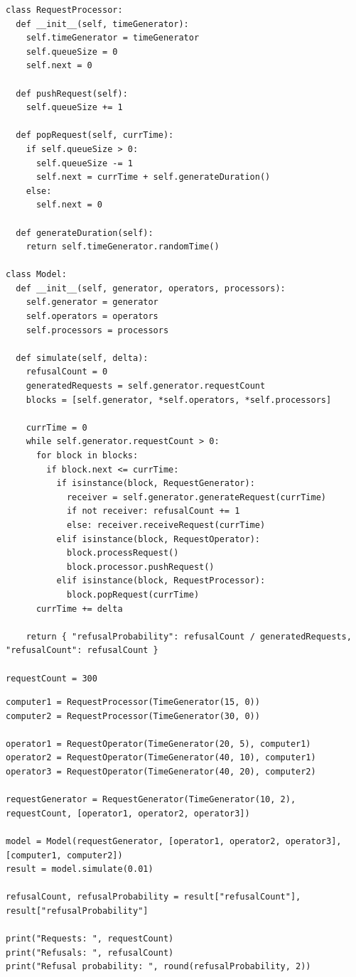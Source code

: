 \documentclass[12pt]{report}
\begin{document}
\begin{lstlisting}
class RequestProcessor:
  def __init__(self, timeGenerator):
    self.timeGenerator = timeGenerator
    self.queueSize = 0
    self.next = 0

  def pushRequest(self):
    self.queueSize += 1

  def popRequest(self, currTime):
    if self.queueSize > 0:
      self.queueSize -= 1
      self.next = currTime + self.generateDuration()
    else:
      self.next = 0

  def generateDuration(self):
    return self.timeGenerator.randomTime()

class Model:
  def __init__(self, generator, operators, processors):
    self.generator = generator
    self.operators = operators
    self.processors = processors

  def simulate(self, delta):
    refusalCount = 0
    generatedRequests = self.generator.requestCount
    blocks = [self.generator, *self.operators, *self.processors]
    
    currTime = 0
    while self.generator.requestCount > 0:
      for block in blocks:
        if block.next <= currTime:
          if isinstance(block, RequestGenerator):
            receiver = self.generator.generateRequest(currTime)
            if not receiver: refusalCount += 1
            else: receiver.receiveRequest(currTime)
          elif isinstance(block, RequestOperator):
            block.processRequest()
            block.processor.pushRequest()
          elif isinstance(block, RequestProcessor):
            block.popRequest(currTime)
      currTime += delta
      
    return { "refusalProbability": refusalCount / generatedRequests, "refusalCount": refusalCount }

requestCount = 300
\end{lstlisting}
\clearpage
\begin{lstlisting}
computer1 = RequestProcessor(TimeGenerator(15, 0))
computer2 = RequestProcessor(TimeGenerator(30, 0))

operator1 = RequestOperator(TimeGenerator(20, 5), computer1)
operator2 = RequestOperator(TimeGenerator(40, 10), computer1)
operator3 = RequestOperator(TimeGenerator(40, 20), computer2)

requestGenerator = RequestGenerator(TimeGenerator(10, 2), requestCount, [operator1, operator2, operator3])

model = Model(requestGenerator, [operator1, operator2, operator3], [computer1, computer2])
result = model.simulate(0.01)

refusalCount, refusalProbability = result["refusalCount"], result["refusalProbability"]

print("Requests: ", requestCount)
print("Refusals: ", refusalCount)
print("Refusal probability: ", round(refusalProbability, 2))
\end{lstlisting}
\end{document}
